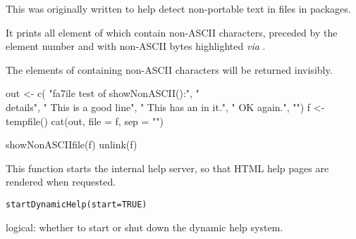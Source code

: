 %
\begin{Details}\relax
This was originally written to help detect non-portable text in
files in packages.

It prints all element of  which contain non-ASCII characters,
preceded by the element number and with non-ASCII bytes highlighted
\emph{via} .
\end{Details}
%
\begin{Value}
The elements of  containing non-ASCII characters will be returned 
invisibly.
\end{Value}
%
\begin{Examples}
\begin{ExampleCode}
out <- c(
"fa\xE7ile test of showNonASCII():",
"\\details{",
"   This is a good line",
"   This has an \xfcmlaut in it.",
"   OK again.",
"}")
f <- tempfile()
cat(out, file = f, sep = "\n")

showNonASCIIfile(f)
unlink(f)
\end{ExampleCode}
\end{Examples}
%
\begin{Description}\relax
This function starts the internal help server, so that HTML help pages
are rendered when requested.
\end{Description}
%
\begin{Usage}
\begin{verbatim}
startDynamicHelp(start=TRUE)
\end{verbatim}
\end{Usage}
%
\begin{Arguments}
\begin{ldescription}
\item[\code{start}] logical: whether to start or shut down the dynamic help
system.
\end{ldescription}
\end{Arguments}
%
